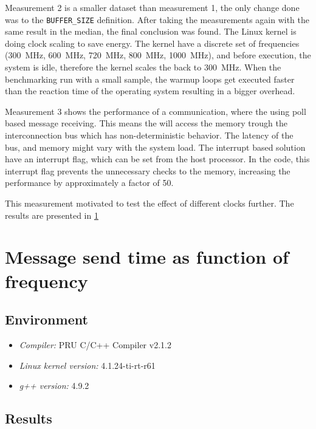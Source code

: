 Measurement 2 is a smaller dataset than measurement 1, the only change done was to the \texttt{BUFFER\_SIZE} definition. After taking the measurements again with the same result in the median, the final conclusion was found. The Linux kernel is doing clock scaling to save energy. The kernel have a discrete set of frequencies (\qty{300}{\MHz}, \qty{600}{\MHz}, \qty{720}{\MHz}, \qty{800}{\MHz}, \qty{1000}{\MHz}), and before execution, the system is idle, therefore the kernel scales the \cpu{} back to \qty{300}{\MHz}. When the benchmarking run with a small sample, the warmup loops get executed faster than the reaction time of the operating system resulting in a bigger overhead.

Measurement 3 shows the performance of a communication, where the \pru{} using poll based message receiving. This means the \pru{} will access the  memory trough the  interconnection bus which has non-deterministic behavior. The latency of the bus, and memory might vary with the system load.
The interrupt based solution have an interrupt flag, which can be set from the host processor. In the code, this interrupt flag prevents the unnecessary checks to the  memory, increasing the performance by approximately a factor of 50.

This measurement motivated to test the effect of different \cpu{} clocks further. The results are presented in \cref{sec:freq}

\section{Message send time as function of \cpu{} frequency}
\label{sec:freq}

\subsection{Environment}
\begin{itemize}
	\item \emph{Compiler:} PRU C/C++ Compiler v2.1.2
	\item \emph{Linux kernel version:} 4.1.24-ti-rt-r61
	\item \emph{g++ version:} 4.9.2
\end{itemize}

\subsection{Results}

